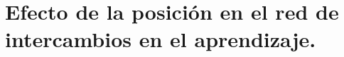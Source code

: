 \documentclass[a4paper,10pt]{book}
\theoremstyle{definition}
\newif\ifen
\newif\ifes
\newcommand{\en}[1]{\ifen#1\fi}
\newcommand{\es}[1]{\ifes#1\fi}
\begin{document}
\section{Efecto de la posición en el red de intercambios en el aprendizaje.} \label{ch:topo}
% 
\end{document}
